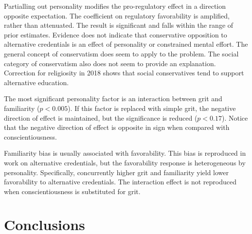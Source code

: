 \documentclass[review]{elsarticle}
\begin{document}
Partialling out personality modifies the pro-regulatory effect in a direction opposite expectation.
The coefficient on regulatory favorability is amplified, rather than attenuated.
The result is significant and falls within the range of prior estimates.
Evidence does not indicate that conservative opposition to alternative credentials is an effect of personality or constrained mental effort.
The general concept of conservatism does seem to apply to the problem.
The social category of conservatism also does not seem to provide an explanation.
Correction for religiosity in 2018 shows that social conservatives tend to support alternative education.

The most significant personality factor is an interaction between grit and familiarity ($p<0.005$).
If this factor is replaced with simple grit,
the negative direction of effect is maintained, but the significance is reduced ($p<0.17$).
Notice that the negative direction of effect is opposite in sign when compared with conscientiousness.

Familiarity bias is usually associated with favorability.
This bias is reproduced in work on alternative credentials,
but the favorability response is heterogeneous by personality.
Specifically, concurrently higher grit and familiarity yield lower favorability to alternative credentials.
The interaction effect is not reproduced when conscientiousness is substituted for grit.

\section{Conclusions}

\end{document}
